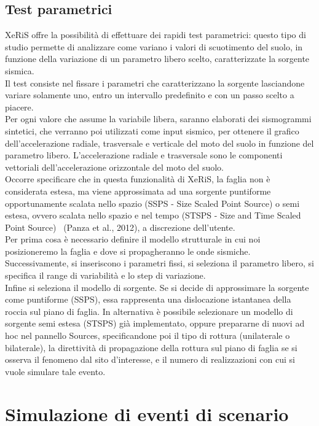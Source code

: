 \documentclass[a4paper,12pt,titlepage]{article}
\begin{document}
\subsection{Test parametrici}
XeRiS offre la possibilità di effettuare dei rapidi test parametrici: questo tipo di studio permette di analizzare come variano i valori di scuotimento del suolo, in funzione della variazione di un parametro libero scelto, caratterizzate la sorgente sismica.\\
Il test consiste nel fissare i parametri che caratterizzano la sorgente lasciandone variare solamente uno, entro un intervallo predefinito e con un passo scelto a piacere.\\
Per ogni valore che assume la variabile libera, saranno elaborati dei sismogrammi sintetici, che verranno poi utilizzati come input sismico, per ottenere il grafico dell'accelerazione radiale, trasversale e verticale del moto del suolo in funzione del parametro libero. L'accelerazione radiale e trasversale sono le componenti vettoriali dell'accelerazione orizzontale del moto del suolo.\\
Occorre specificare che in questa funzionalità di XeRiS, la faglia non è considerata estesa, ma viene approssimata ad una sorgente puntiforme opportunamente scalata nello spazio (SSPS - Size Scaled Point Source) o semi estesa,
ovvero scalata nello spazio e nel tempo (STSPS - Size and Time Scaled Point Source)~\nocite{Panza2012} (Panza et al., 2012), a discrezione dell'utente.\\
Per prima cosa è necessario definire il modello strutturale in cui noi posizioneremo la faglia e dove si propagheranno le onde sismiche.\\
Successivamente, si inseriscono i parametri fissi, si seleziona il parametro libero, si specifica il range di variabilità e lo step di variazione.\\
Infine si seleziona il modello di sorgente. Se si decide di approssimare la sorgente come puntiforme (SSPS), essa rappresenta una dislocazione istantanea della roccia sul piano di faglia. In alternativa è possibile selezionare un modello di sorgente semi estesa (STSPS) già implementato, oppure prepararne di nuovi ad hoc nel pannello Sources, specificandone poi il tipo di rottura (unilaterale o bilaterale), la direttività di propagazione della rottura sul piano di faglia se si osserva il fenomeno dal sito d'interesse, e il numero di realizzazioni con cui si vuole simulare tale evento.
\clearpage

\section{Simulazione di eventi di scenario}
\end{document}
